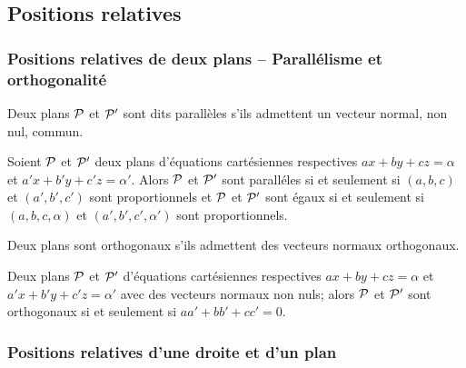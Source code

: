 \subsection{Positions relatives}

\subsubsection{Positions relatives de deux plans -- Parallélisme et orthogonalité}

\begin{defdef}
  Deux plans $\P$ et $\P'$ sont dits parallèles s'ils admettent un vecteur normal, non nul, commun.
\end{defdef}
\begin{prop}
  Soient $\P$ et $\P'$ deux plans d'équations cartésiennes respectives $ax+by+cz=\alpha$ et $a'x+b'y+c'z=\alpha'$. Alors $\P$ et $\P'$ sont paralléles si et seulement si $(a,b,c)$ et $(a',b',c')$ sont proportionnels et $\P$ et $\P'$ sont égaux si et seulement si $(a,b,c,\alpha)$ et $(a',b',c',\alpha')$ sont proportionnels.
\end{prop}
\begin{defdef}
  Deux plans sont orthogonaux s'ils admettent des vecteurs normaux orthogonaux.
\end{defdef}
\begin{prop}
  Deux plans $\P$ et $\P'$ d'équations cartésiennes respectives $ax+by+cz=\alpha$ et $a'x+b'y+c'z=\alpha'$ avec des vecteurs normaux non nuls; alors $\P$ et $\P'$ sont orthogonaux si et seulement si $aa'+bb'+cc'=0$.
\end{prop}

\subsubsection{Positions relatives d'une droite et d'un plan}

